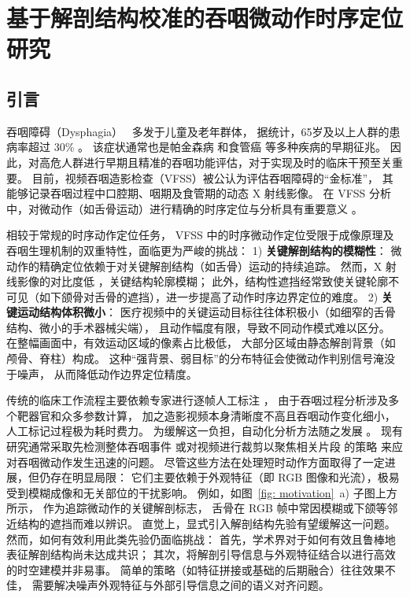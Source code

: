 \chapter{基于解剖结构校准的吞咽微动作时序定位研究}
\section{引言}
吞咽障碍（Dysphagia）~\cite{rommel2016oropharyngeal} 多发于儿童及老年群体，
据统计，65岁及以上人群的患病率超过 30\% \cite{lee2019automatic}。
该症状通常也是帕金森病 \cite{pflug2018critical} 和食管癌 \cite{hughes2011management} 等多种疾病的早期征兆。
因此，对高危人群进行早期且精准的吞咽功能评估，对于实现及时的临床干预至关重要。
目前，视频吞咽造影检查（VFSS）被公认为评估吞咽障碍的“金标准”，
其能够记录吞咽过程中口腔期、咽期及食管期的动态 X 射线影像。
在 VFSS 分析中，对微动作（如舌骨运动）进行精确的时序定位与分析具有重要意义 
\cite{molfenter2012temporal, kendall2000timing}。

相较于常规的时序动作定位任务，
VFSS 中的时序微动作定位受限于成像原理及吞咽生理机制的双重特性，面临更为严峻的挑战：
1) \textbf{关键解剖结构的模糊性}：
微动作的精确定位依赖于对关键解剖结构（如舌骨）运动的持续追踪。
然而，X 射线影像的对比度低 \cite{zheng2004automated, amiot2016spatio} ，关键结构轮廓模糊；
此外，结构性遮挡经常致使关键轮廓不可见（如下颌骨对舌骨的遮挡），进一步提高了动作时序边界定位的难度。
2) \textbf{关键运动结构体积微小}：
医疗视频中的关键运动目标往往体积极小（如细窄的舌骨结构、微小的手术器械尖端）\cite{ruan2023temporal}，
且动作幅度有限，导致不同动作模式难以区分。
在整幅画面中，有效运动区域的像素占比极低，
大部分区域由静态解剖背景（如颅骨、脊柱）构成。
这种“强背景、弱目标”的分布特征会使微动作判别信号淹没于噪声，
从而降低动作边界定位精度。

传统的临床工作流程主要依赖专家进行逐帧人工标注 \cite{kellen2010computer}，
由于吞咽过程分析涉及多个靶器官和众多参数计算，
加之造影视频本身清晰度不高且吞咽动作变化细小，人工标记过程极为耗时费力。
为缓解这一负担，自动化分析方法随之发展 \cite{ruan2023temporal, jeong2023application}。
现有研究通常采取先检测整体吞咽事件 \cite{ruan2023temporal} 
或对视频进行裁剪以聚焦相关片段 \cite{jeong2023application} 的策略
来应对吞咽微动作发生迅速的问题。
尽管这些方法在处理短时动作方面取得了一定进展，但仍存在明显局限：
它们主要依赖于外观特征（即 RGB 图像和光流），极易受到模糊成像和无关部位的干扰影响。
例如，如图~\ref{fig: motivation}~a) 子图上方所示，
作为追踪微动作的关键解剖标志，
舌骨在 RGB 帧中常因模糊或下颌等邻近结构的遮挡而难以辨识。
直觉上，显式引入解剖结构先验有望缓解这一问题。
然而，如何有效利用此类先验仍面临挑战：
首先，学术界对于如何有效且鲁棒地表征解剖结构尚未达成共识；
其次，将解剖引导信息与外观特征结合以进行高效的时空建模并非易事。
简单的策略（如特征拼接或基础的后期融合）往往效果不佳，
需要解决噪声外观特征与外部引导信息之间的语义对齐问题。

